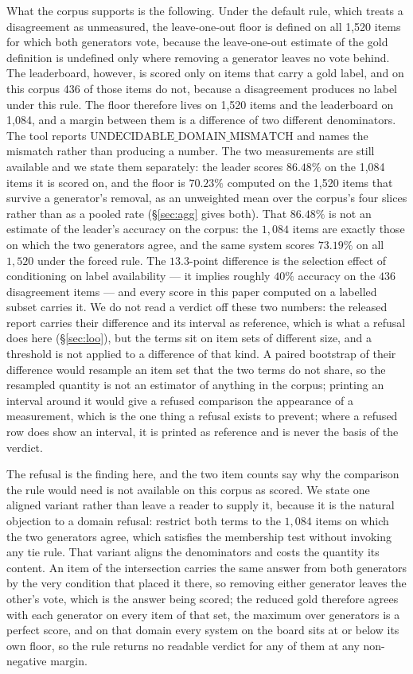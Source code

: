 \documentclass{article}
\begin{document}
What the corpus supports is the following. Under the default rule, which treats a disagreement as unmeasured, the leave-one-out floor is defined on all 1,520 items for which both generators vote, because the leave-one-out estimate of the gold definition is undefined only where removing a generator leaves no vote behind. The leaderboard, however, is scored only on items that carry a gold label, and on this corpus 436 of those items do not, because a disagreement produces no label under this rule. The floor therefore lives on 1,520 items and the leaderboard on 1,084, and a margin between them is a difference of two different denominators. The tool reports $\mathrm{UNDECIDABLE\_DOMAIN\_MISMATCH}$ and names the mismatch rather than producing a number. The two measurements are still available and we state them separately: the leader scores $86.48\%$ on the 1,084 items it is scored on, and the floor is $70.23\%$ computed on the 1,520 items that survive a generator's removal, as an unweighted mean over the corpus's four slices rather than as a pooled rate (\S\ref{sec:agg} gives both). That $86.48\%$ is not an estimate of the leader's accuracy on the corpus: the $1{,}084$ items are exactly those on which the two generators agree, and the same system scores $73.19\%$ on all $1{,}520$ under the forced rule. The $13.3$-point difference is the selection effect of conditioning on label availability --- it implies roughly $40\%$ accuracy on the $436$ disagreement items --- and every score in this paper computed on a labelled subset carries it. We do not read a verdict off these two numbers: the released report carries their difference and its interval as reference, which is what a refusal does here (\S\ref{sec:loo}), but the terms sit on item sets of different size, and a threshold is not applied to a difference of that kind. A paired bootstrap of their difference would resample an item set that the two terms do not share, so the resampled quantity is not an estimator of anything in the corpus; printing an interval around it would give a refused comparison the appearance of a measurement, which is the one thing a refusal exists to prevent; where a refused row does show an interval, it is printed as reference and is never the basis of the verdict. 

The refusal is the finding here, and the two item counts say why the comparison the rule would need is not available on this corpus as scored. We state one aligned variant rather than leave a reader to supply it, because it is the natural objection to a domain refusal: restrict both terms to the $1,084$ items on which the two generators agree, which satisfies the membership test without invoking any tie rule. That variant aligns the denominators and costs the quantity its content. An item of the intersection carries the same answer from both generators by the very condition that placed it there, so removing either generator leaves the other's vote, which is the answer being scored; the reduced gold therefore agrees with each generator on every item of that set, the maximum over generators is a perfect score, and on that domain every system on the board sits at or below its own floor, so the rule returns no readable verdict for any of them at any non-negative margin. 
\end{document}
